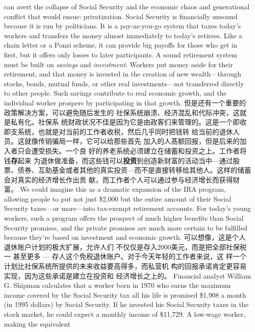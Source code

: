 \begin{paracol}{2}
can avert the collapse of Social Security and the economic chaos
and generational conflict that would ensue: privatization. Social
Security is financially unsound because it is run by politicians. It
is a pay-as-you-go system that taxes today's workers and transfers the money almost immediately to today's retirees. Like a
chain letter or a Ponzi scheme, it can provide big payoffs for
those who get in first, but it offers only losses to later participants. A sound retirement system must be built on \textit{savings} and \textit{investment}. Workers put money aside for their retirement, and
that money is invested in the creation of new wealth---through
stocks, bonds, mutual funds, or other real investments---not
transferred directly to other people. Such savings contribute to
real economic growth, and the individual worker prospers by
participating in that growth.
\switchcolumn
但是还有一个重要的政策解决方案，可以避免随后发生的
社保系统崩溃、经济混乱和代际冲突，这就是私有化。社保系
统财政状况不佳是因为它是由政客们来管理的。这是一个即收
即支系统，也就是对当前的工作者收税，然后几乎同时把钱转
给当前的退休人员。这就像传销骗局一样，它可以给那些首先
加入的人髙额回报，但是后来的加入者只会遭受损失。一个良
好的养老系统必须建立在储蓄和投资之上。工作者将钱\textbf{存}起来
为退休做准备，而这些钱可以\textbf{投资}到创造新财富的活动当中---通过股票、债券、互助基金或者其他的真实投资---而不是直接转移给其他人。这样的储蓄会对真实的经济增长作出贡
献，而工作者个人可以通过参与经济增长而获得财富。
\switchcolumn*
We could imagine this as a dramatic expansion of the IRA
program, allowing people to put not just \$2,000 but the entire
amount of their Social Security taxes---or more---into tax-exempt retirement accounts. For today's young workers, such a
program offers the prospect of much higher benefits than Social
Security promises, and the private promises are much more certain to be fulfilled because they're based on investment and economic growth.
\switchcolumn
可以想像，这是个人退休账户计划的极大扩展，允许人们
不仅仅是存入2000美元，而是把全部社保税一 甚至更多
--- 存人这个免税退休账户。对于今天年轻的工作者来说，这
样一个计划比社保系统所提供的未来收益要高得多，而私营机
构的回报承诺肯定更容易实现，因为这些承诺是建立在投资和
经济增长之上的。
\switchcolumn*
Financial analyst William G. Shipman calculates that a
worker born in 1970 who earns the maximum income covered
by the Social Security tax all his life is promised \$1,908 a month
(in 1995 dollars) by Social Security. If he invested his Social Security taxes in the stock market, he could expect a monthly income of \$11,729. A low-wage worker, making the equivalent

\end{paracol}
